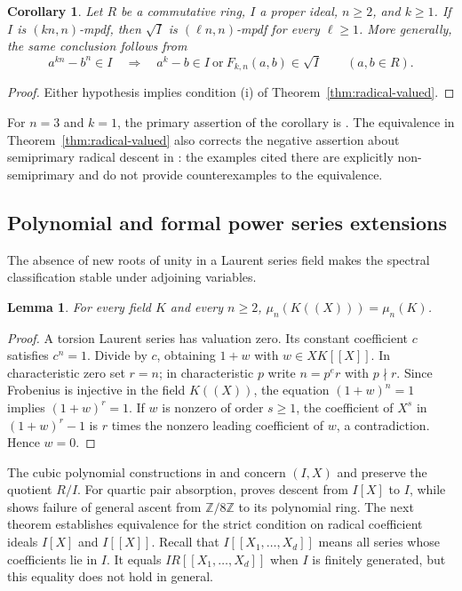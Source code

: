 \documentclass[11pt,a4paper]{amsart}
\newtheorem{lemma}[theorem]{Lemma}
\newtheorem{corollary}[theorem]{Corollary}
\theoremstyle{definition}
\theoremstyle{remark}
\newcommand{\Z}{\mathbb Z}
\numberwithin{equation}{section}
\begin{document}
\begin{corollary}\label{thm:radical-descent}
Let $R$ be a commutative ring, $I$ a proper ideal, $n\ge2$, and
$k\ge1$. If $I$ is $(kn,n)$-mpdf, then $\sqrt I$ is
$(\ell n,n)$-mpdf for every $\ell\ge1$. More generally, the same
conclusion follows from
\[
 a^{kn}-b^n\in I\quad\Longrightarrow\quad
 a^k-b\in I\ \text{or}\ F_{k,n}(a,b)\in\sqrt I
 \qquad(a,b\in R).
\]
\end{corollary}
\begin{proof}
Either hypothesis implies condition (i) of
Theorem~\ref{thm:radical-valued}.
\end{proof}

For $n=3$ and $k=1$, the primary assertion of the corollary is
\cite[Theorem~2]{YSO}. The equivalence in
Theorem~\ref{thm:radical-valued} also corrects the negative assertion
about semiprimary radical descent in \cite[Remark~2.5]{Dr26}:
the examples cited there are explicitly non-semiprimary and do not
provide counterexamples to the equivalence.

\subsection{Polynomial and formal power series extensions}

The absence of new roots of unity in a Laurent series field makes the
spectral classification stable under adjoining variables.

\begin{lemma}\label{lem:Laurent-torsion}
For every field $K$ and every $n\ge2$,
$\mu_n(K((X)))=\mu_n(K)$.
\end{lemma}
\begin{proof}
A torsion Laurent series has valuation zero.  Its constant coefficient
$c$ satisfies $c^n=1$.  Divide by $c$, obtaining $1+w$ with
$w\in XK[[X]]$.  In characteristic zero set $r=n$; in characteristic
$p$ write $n=p^er$ with $p\nmid r$.  Since Frobenius is injective in
the field $K((X))$, the equation $(1+w)^n=1$ implies
$(1+w)^r=1$.  If $w$ is nonzero of order $s\ge1$, the coefficient
of $X^s$ in $(1+w)^r-1$ is $r$ times the nonzero leading coefficient
of $w$, a contradiction.  Hence $w=0$.
\end{proof}

The cubic polynomial constructions in \cite[Theorem~5.1]{Dr26} and
\cite[Theorem~7(2)]{YSO} concern $(I,X)$ and preserve the quotient
$R/I$. For quartic pair absorption, \cite[Proposition~3.9]{TAHA}
proves descent from $I[X]$ to $I$, while \cite[Example~3.10]{TAHA}
shows failure of general ascent from $\Z/8\Z$ to its polynomial
ring. The next theorem establishes equivalence for the strict
condition on radical coefficient ideals $I[X]$ and $I[[X]]$.
Recall that $I[[X_1,\ldots,X_d]]$ means all series whose coefficients lie in $I$.  It equals $IR[[X_1,\ldots,X_d]]$ when $I$ is finitely
generated, but this equality does not hold in general.
\end{document}
